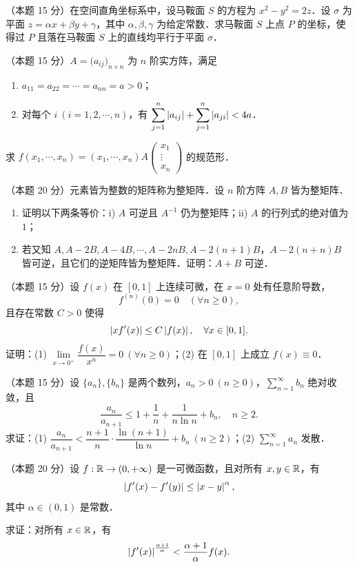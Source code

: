 
\begin{problems}

\item[一、]（本题 15 分）在空间直角坐标系中，设马鞍面 $S$ 的方程为 $x^{2}-y^{2}=2z$．设 $\sigma$ 为平面 $z=\alpha x+\beta y+\gamma$，其中 $\alpha,\beta,\gamma$ 为给定常数．求马鞍面 $S$ 上点 $P$ 的坐标，使得过 $P$ 且落在马鞍面 $S$ 上的直线均平行于平面 $\sigma$．

\item[二、]（本题 15 分）$A=\bigl(a_{ij}\bigr)_{n\times n}$ 为 $n$ 阶实方阵，满足
\begin{enumerate}
  \item $a_{11}=a_{22}=\cdots=a_{nn}=a>0$；
  \item 对每个 $i\ (i=1,2,\cdots,n)$，有 $\displaystyle\sum_{j=1}^{n}\left|a_{ij}\right|+\sum_{j=1}^{n}\left|a_{ji}\right|<4a$．
\end{enumerate}
求 $f(x_{1},\cdots,x_{n})=(x_{1},\cdots,x_{n})A\begin{pmatrix}x_{1}\\ \vdots\\ x_{n}\end{pmatrix}$ 的规范形．

\item[三、]（本题 20 分）元素皆为整数的矩阵称为整矩阵．设 $n$ 阶方阵 $A,B$ 皆为整矩阵．
\begin{enumerate}
  \item 证明以下两条等价：i) $A$ 可逆且 $A^{-1}$ 仍为整矩阵；ii) $A$ 的行列式的绝对值为 $1$；
  \item 若又知 $A,A-2B,A-4B,\cdots,A-2nB,A-2(n+1)B$，$A-2(n+n)B$ 皆可逆，且它们的逆矩阵皆为整矩阵．证明：$A+B$ 可逆．
\end{enumerate}

\item[四、]（本题 15 分）设 $f(x)$ 在 $[0,1]$ 上连续可微，在 $x=0$ 处有任意阶导数，
\[
  f^{(n)}(0)=0\quad(\forall n\ge 0),
\]
且存在常数 $C>0$ 使得
\[
  \left|xf'(x)\right|\le C\left|f(x)\right|,\quad \forall x\in[0,1].
\]
证明：(1) $\lim\limits_{x\to 0^{+}}\dfrac{f(x)}{x^{n}}=0\ (\forall n\ge 0)$；(2) 在 $[0,1]$ 上成立 $f(x)\equiv 0$．

\item[五、]（本题 15 分）设 $\{a_{n}\},\{b_{n}\}$ 是两个数列，$a_{n}>0\ (n\ge 0)$，$\sum\limits_{n=1}^{\infty}b_{n}$ 绝对收敛，且
\[
  \frac{a_{n}}{a_{n+1}}\le 1+\frac{1}{n}+\frac{1}{n\ln n}+b_{n},\quad n\ge 2.
\]
求证：(1) $\dfrac{a_{n}}{a_{n+1}}<\dfrac{n+1}{n}\cdot\dfrac{\ln(n+1)}{\ln n}+b_{n}\ (n\ge 2)$；(2) $\sum\limits_{n=1}^{\infty}a_{n}$ 发散．

\item[六、]（本题 20 分）设 $f:\mathbb{R}\to(0,+\infty)$ 是一可微函数，且对所有 $x,y\in\mathbb{R}$，有
\[
  \left|f'(x)-f'(y)\right|\le \left|x-y\right|^{\alpha},
\]
其中 $\alpha\in(0,1)$ 是常数．

求证：对所有 $x\in\mathbb{R}$，有
\[
  \left|f'(x)\right|^{\frac{\alpha+1}{\alpha}}<\frac{\alpha+1}{\alpha}f(x).
\]

\end{problems}
